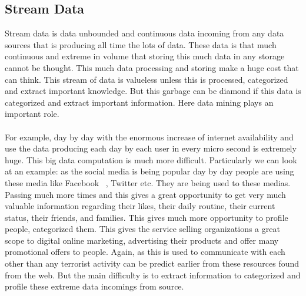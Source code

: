 \subsection{Stream Data}
Stream data is data unbounded and continuous data incoming from any data sources that is producing all time the lots of data. These data is that much continuous and extreme in volume that storing this much data in any storage cannot be thought. This much data processing and storing make a huge cost that can think. This stream of data is valueless unless this is processed, categorized and extract important knowledge. But this garbage can be diamond if this data is categorized and extract important information. Here data mining plays an important role.\\ \\
For example, day by day with the enormous increase of internet availability and use the data producing each day by each user in every micro second is extremely huge. This big data computation is much more difficult. Particularly we can look at an example: as the social media is being popular day by day people are using these media like Facebook ~\cite{facebook}, Twitter \cite{twitter} etc. They are being used to these medias. Passing much more times and this gives a great opportunity to get very much valuable information regarding their likes, their daily routine, their current status, their friends, and families. This gives much more opportunity to profile people, categorized them. This gives the service selling organizations a great scope to digital online marketing, advertising their products and offer many promotional offers to people. Again, as this is used to communicate with each other than any terrorist activity can be predict earlier from these resources found from the web. But the main difficulty is to extract information to categorized and profile these extreme data incomings from source.

